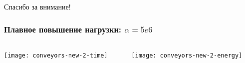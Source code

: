 \documentclass{beamer}
\begin{document}



\begin{frame}
  \begin{center}
    {\Huge Спасибо за внимание!}
  \end{center}
\end{frame}

\appendix
\begin{frame}
  \frametitle{Плавное повышение нагрузки: $\alpha = 5e6$}
  \begin{columns}
    \begin{column}{0.5\textwidth}
      \texttt{[image: conveyors-new-2-time]}
    \end{column}
    \begin{column}{0.5\textwidth}
      \texttt{[image: conveyors-new-2-energy]}
    \end{column}
  \end{columns}
\end{frame}
\end{document}
